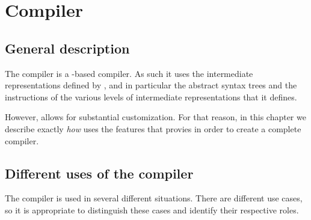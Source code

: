 \chapter{Compiler}
\label{chap-compiler}

\section{General description}

The \sysname{} compiler is a \cleavir{}-based compiler.  As such it uses
the intermediate representations defined by \cleavir{}, and in
particular the abstract syntax trees and the instructions of the
various levels of intermediate representations that it defines.

However, \cleavir{} allows for substantial customization.  For that
reason, in this chapter we describe exactly \emph{how} \sysname{} uses
the features that \cleavir{} provies in order to create a complete
compiler.

\section{Different uses of the compiler}

The compiler is used in several different situations.  There are
different use cases, so it is appropriate to distinguish these cases
and identify their respective roles.

